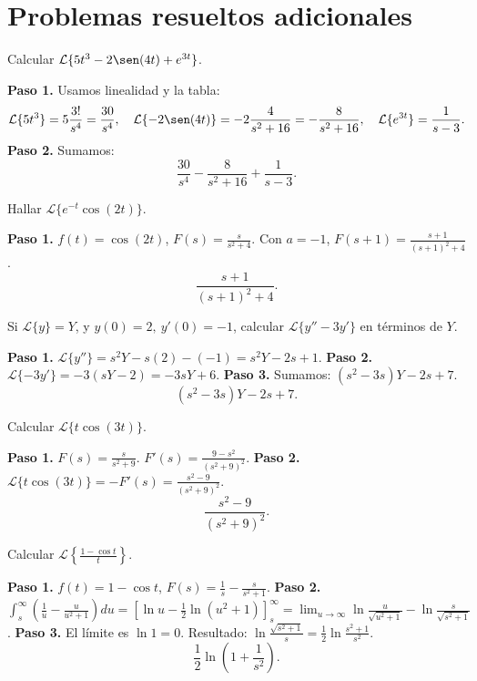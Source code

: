 \section{Problemas resueltos adicionales}

\begin{prob}
Calcular $\mathcal{L}\{5t^3 - 2\sen(4t) + e^{3t}\}$.
\begin{myproof}
\textbf{Paso 1.} Usamos linealidad y la tabla:
\[
\mathcal{L}\{5t^3\} = 5\frac{3!}{s^4}=\frac{30}{s^4},\quad
\mathcal{L}\{-2\sen(4t)\} = -2\frac{4}{s^2+16} = -\frac{8}{s^2+16},\quad
\mathcal{L}\{e^{3t}\}=\frac{1}{s-3}.
\]
\textbf{Paso 2.} Sumamos:
\[
\boxed{\frac{30}{s^4} - \frac{8}{s^2+16} + \frac{1}{s-3}.}
\]
\end{myproof}
\end{prob}

\begin{prob}
Hallar $\mathcal{L}\{e^{-t}\cos(2t)\}$.
\begin{myproof}
\textbf{Paso 1.} $f(t)=\cos(2t)$, $F(s)=\frac{s}{s^2+4}$. Con $a=-1$, $F(s+1)=\frac{s+1}{(s+1)^2+4}$.
\[
\boxed{\frac{s+1}{(s+1)^2+4}.}
\]
\end{myproof}
\end{prob}

\begin{prob}
Si $\mathcal{L}\{y\}=Y$, y $y(0)=2,\ y'(0)=-1$, calcular $\mathcal{L}\{y''-3y'\}$ en términos de $Y$.
\begin{myproof}
\textbf{Paso 1.} $\mathcal{L}\{y''\}=s^2Y - s(2) - (-1)=s^2Y -2s+1$.
\textbf{Paso 2.} $\mathcal{L}\{-3y'\} = -3(sY - 2) = -3sY+6$.
\textbf{Paso 3.} Sumamos: $(s^2-3s)Y -2s+7$.
\[
\boxed{(s^2-3s)Y -2s + 7.}
\]
\end{myproof}
\end{prob}

\begin{prob}
Calcular $\mathcal{L}\{t\cos(3t)\}$.
\begin{myproof}
\textbf{Paso 1.} $F(s)=\frac{s}{s^2+9}$. $F'(s)=\frac{9-s^2}{(s^2+9)^2}$.
\textbf{Paso 2.} $\mathcal{L}\{t\cos(3t)\} = -F'(s) = \frac{s^2-9}{(s^2+9)^2}$.
\[
\boxed{\frac{s^2-9}{(s^2+9)^2}.}
\]
\end{myproof}
\end{prob}

\begin{prob}
Calcular $\mathcal{L}\left\{\frac{1-\cos t}{t}\right\}$.
\begin{myproof}
\textbf{Paso 1.} $f(t)=1-\cos t$, $F(s)=\frac{1}{s} - \frac{s}{s^2+1}$.
\textbf{Paso 2.} $\int_s^\infty \left(\frac{1}{u} - \frac{u}{u^2+1}\right) du = [\ln u - \frac{1}{2}\ln(u^2+1)]_s^\infty = \lim_{u\to\infty}\ln\frac{u}{\sqrt{u^2+1}} - \ln\frac{s}{\sqrt{s^2+1}}$.
\textbf{Paso 3.} El límite es $\ln 1 = 0$. Resultado: $\ln\frac{\sqrt{s^2+1}}{s} = \frac{1}{2}\ln\frac{s^2+1}{s^2}$.
\[
\boxed{\frac{1}{2}\ln\left(1+\frac{1}{s^2}\right).}
\]
\end{myproof}
\end{prob}

